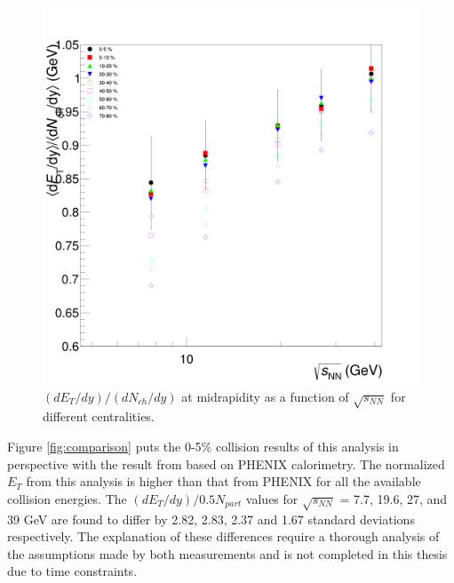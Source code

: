 	\begin{figure}[h]
	  \centering
	  \includegraphics[width=5.5in]{figures/finalStacked/dETdyOverdNchdySumCent8s.png}
	  \caption{$(dE_{T}/dy)/(dN_{ch}/dy)$ at midrapidity as a function of $\sqrt{s_{NN}}$ for different centralities.}\label{fig:dETdyOverdNchdySumCents}
	\end{figure}
	
Figure \ref{fig:comparison} puts the 0-5\% collision results of this analysis in perspective with the result from \cite{PhysRevC.93.024901} based on PHENIX calorimetry. The normalized $E_{T}$ from this analysis is higher than that from PHENIX for all the available collision energies. The $(dE_{T}/dy)/0.5N_{part}$ values for $\sqrt{s_{NN}}$ = 7.7, 19.6, 27, and 39 GeV are found to differ by 2.82, 2.83, 2.37 and 1.67 standard deviations respectively. The explanation of these differences require a thorough analysis of the assumptions made by both measurements and is not completed in this thesis due to time constraints.
 

